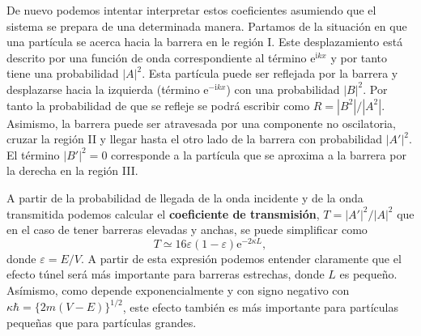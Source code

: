 \documentclass{tufte-handout}
\begin{document}
De nuevo podemos intentar interpretar estos coeficientes 
asumiendo que el sistema se prepara de una determinada 
manera. Partamos de la situación en que una partícula se
acerca hacia la barrera en le región I. Este desplazamiento
está descrito por una función
de onda correspondiente al término $\mathrm{e}^{\mathrm{i}kx}$ 
y por tanto tiene una probabilidad $|A|^2$. Esta partícula
puede ser reflejada por la barrera y desplazarse hacia la
izquierda (término $\mathrm{e}^{-\mathrm{i}kx}$) con una 
probabilidad $|B|^2$. Por tanto la probabilidad de que se
refleje se podrá escribir como $R=|B^2|/|A^2|$. Asimismo,
la barrera puede ser atravesada por una componente no 
oscilatoria, cruzar la región II y llegar hasta el otro lado 
de la barrera con probabilidad $|A'|^2$. El término $|B'|^2=0$
corresponde a la partícula que se aproxima a la barrera por la 
derecha en la región III.

A partir de la probabilidad de llegada de la onda incidente
y de la onda transmitida podemos calcular
el \textbf{coeficiente de transmisión}, 
    $T=|A'|^2/|A|^2$
que en el caso de tener 
barreras elevadas y anchas, se puede simplificar como
\begin{equation}
    T\simeq 16\varepsilon(1-\varepsilon)\mathrm{e}^{-2\kappa L},
\end{equation}
donde $\varepsilon=E/V$. A partir de esta expresión podemos
entender claramente que el efecto túnel será más importante 
para barreras estrechas, donde $L$ es pequeño. Asímismo,
como depende exponencialmente y con signo negativo con 
$\kappa\hbar=\{2m(V-E)\}^{1/2}$, este efecto también es
más importante para partículas pequeñas que para partículas
grandes.
\end{document}
